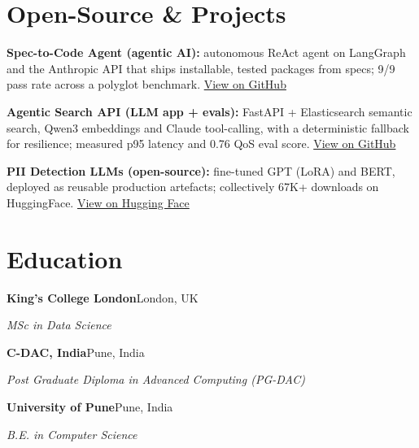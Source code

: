 \documentclass[10pt,a4paper]{article}
\begin{document}
\section{Open-Source \& Projects}
\begin{tight}
  \item \textbf{Spec-to-Code Agent (agentic AI):} autonomous ReAct agent on LangGraph and the Anthropic API that ships installable, tested packages from specs; 9/9 pass rate across a polyglot benchmark. \href{https://github.com/abhijeetscode/Spec-to-Code-Agent}{View on GitHub}
  \item \textbf{Agentic Search API (LLM app + evals):} FastAPI + Elasticsearch semantic search, Qwen3 embeddings and Claude tool-calling, with a deterministic fallback for resilience; measured p95 latency and 0.76 QoS eval score. \href{https://github.com/abhijeetscode/search-agent}{View on GitHub}
  \item \textbf{PII Detection LLMs (open-source):} fine-tuned GPT (LoRA) and BERT, deployed as reusable production artefacts; collectively 67K+ downloads on HuggingFace. \href{https://huggingface.co/ab-ai/pii_model}{View on Hugging Face}
\end{tight}

\section{Education}
{\color{company}\bfseries King's College London}\hfill {\color{muted}London, UK}\par
{\itshape MSc in Data Science}\par\vspace{2pt}
{\color{company}\bfseries C-DAC, India}\hfill {\color{muted}Pune, India}\par
{\itshape Post Graduate Diploma in Advanced Computing (PG-DAC)}\par\vspace{2pt}
{\color{company}\bfseries University of Pune}\hfill {\color{muted}Pune, India}\par
{\itshape B.E. in Computer Science}\par
\end{document}
